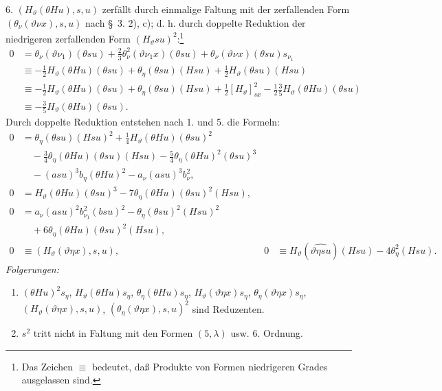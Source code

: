 \documentclass[11pt]{article}
\begin{document}
6. $(H_\vartheta(\theta Hu),s,u)$ zerfällt durch einmalige Faltung mit der zerfallenden Form $(\theta_\nu(\vartheta\nu x),s,u)$ nach \S\ 3. 2), c); d. h. durch doppelte Reduktion der niedrigeren zerfallenden Form $(H_\vartheta su)^2$:\footnote{Das Zeichen $\equiv$ bedeutet, daß Produkte von Formen niedrigeren Grades ausgelassen sind.}
\begin{align*}
0&=\theta_\nu(\vartheta\nu_1)(\theta su)+\frac23\theta_\nu^2(\vartheta\nu_1x)(\theta su)+\theta_\nu(\vartheta\nu x)(\theta su)s_{\nu_1}\\
&\equiv -\frac12H_\vartheta(\theta Hu)(\theta su)+\theta_\eta(\theta su)(Hsu)+\frac12H_\vartheta(\theta su)(Hsu)\\
&\equiv -\frac12H_\vartheta(\theta Hu)(\theta su)+\theta_\eta(\theta su)(Hsu)+\frac12[H_\vartheta]_{sx}^2-\frac12\frac35H_\vartheta(\theta Hu)(\theta su)\\
&\equiv -\frac35H_\vartheta(\theta Hu)(\theta su).
\end{align*}
Durch doppelte Reduktion entstehen nach 1. und 5. die Formeln:
\begin{equation}
\tag{31}
\begin{aligned}
0&=\theta_\eta(\theta su)(Hsu)^2+\frac14H_\vartheta(\theta Hu)(\theta su)^2\\
&\quad-\frac34\theta_\eta(\theta Hu)(\theta su)(Hsu)-\frac54\theta_\eta(\theta Hu)^2(\theta su)^3\\
&\quad-(asu)^3b_\eta(\theta Hu)^2-a_\nu(asu)^3b_\nu^2,\\
0&=H_\vartheta(\theta Hu)(\theta su)^3-7\theta_\eta(\theta Hu)(\theta su)^2(Hsu),\\
0&=a_\nu(asu)^2b_{\nu_1}^{2}(bsu)^2-\theta_\eta(\theta su)^2(Hsu)^2\\
&\quad+6\theta_\eta(\theta Hu)(\theta su)^2(Hsu),\\
0&\equiv (H_\vartheta(\vartheta\eta x),s,u),
&0&\equiv H_\vartheta(\widehat{\vartheta\eta su})(Hsu)-4\theta_\eta^2(Hsu).
\end{aligned}
\end{equation}
\noindent\emph{Folgerungen:}
\begin{enumerate}
\item $(\theta Hu)^2s_\eta$, $H_\vartheta(\theta Hu)s_\eta$, $\theta_\eta(\theta Hu)s_\eta$, $H_\vartheta(\vartheta\eta x)s_\eta$, $\theta_\eta(\vartheta\eta x)s_\eta$, $(H_\vartheta(\vartheta\eta x),s,u)$, $(\theta_\eta(\vartheta\eta x),s,u)^2$ sind Reduzenten.
\item $s^2$ tritt nicht in Faltung mit den Formen $(5,\lambda)$ usw. 6. Ordnung.
\end{enumerate}
\end{document}

